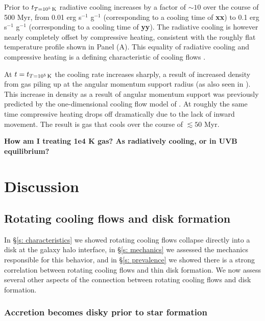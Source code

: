 \documentclass[fleqn,usenatbib]{mnras}
\newcommand{\tcon}{t_{T=10^5\,{\rm K}}}
\begin{document}
Prior to $\tcon$ radiative cooling increases by a factor of $\sim 10$ over the course of 500 Myr, from 0.01 erg s$^{-1}$ g$^{-1}$ (corresponding to a cooling time of \textbf{xx}) to 0.1 erg s$^{-1}$ g$^{-1}$ (corresponding to a cooling time of \textbf{yy}).
The radiative cooling is however nearly completely offset by compressive heating, consistent with the roughly flat temperature profile shown in Panel (A).
This equality of radiative cooling and compressive heating is a defining characteristic of cooling flows \citep{Mathews78, McNamara2007, Stern2020}. 

At $t=\tcon$ the cooling rate increases sharply, a result of increased density from gas piling up at the angular momentum support radius (as also seen in \citealt{Trapp2021}).
This increase in density as a result of angular momentum support was previously predicted by the one-dimensional cooling flow model of \cite{Cowie1980}.
At roughly the same time compressive heating drops off dramatically due to the lack of inward movement.
The result is gas that cools over the course of $\lesssim 50$ Myr.

\textbf{
How am I treating 1e4 K gas?
As radiatively cooling, or in UVB equilibrium?
}

\section{Discussion}
\label{s: discussion}

\subsection{Rotating cooling flows and disk formation}
\label{s: disk formation}

In \S\ref{s: characteristics} we showed rotating cooling flows collapse directly into a disk at the galaxy halo interface, in \S\ref{s: mechanics} we assessed the mechanics responsible for this behavior, and in \S\ref{s: prevalence} we showed there is a strong correlation between rotating cooling flows and thin disk formation.
We now assess several other aspects of the connection between rotating cooling flows and disk formation.

\subsubsection{Accretion becomes disky prior to star formation}
\label{s: disk formation -- condition}
\end{document}
